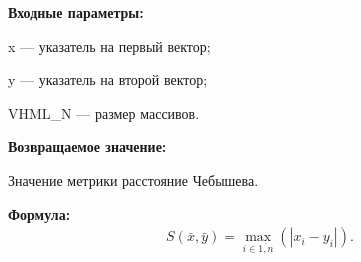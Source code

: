 \textbf{Входные параметры:}
 
x --- указатель на первый вектор;
 
y --- указатель на второй вектор;
 
VHML\_N --- размер массивов.

\textbf{Возвращаемое значение:}
 
Значение метрики расстояние Чебышева.

\textbf{Формула:}
\begin{eqnarray*}
S\left( \bar{x}, \bar{y}\right)=\max_{i\in\overline{1,n}}\left( \left|x_i-y_i \right| \right)  .
\end{eqnarray*}